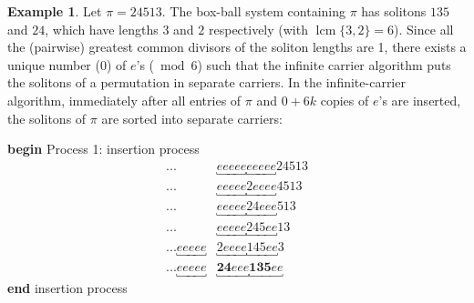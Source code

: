 \documentclass[submission]{FPSAC2021}
\theoremstyle{plain}
\theoremstyle{definition}
\newtheorem{example}[theorem]{Example}
\numberwithin{equation}{section}
\DeclareMathOperator{\lcm}{lcm}
\begin{document}
\begin{example}
Let $\pi = 24513$. The box-ball system containing $\pi$ has 
solitons $135$ and $24$, which have lengths $3$ and $2$ respectively (with $\lcm\{3,2\}=6 $).  
Since all the (pairwise) greatest common divisors of the soliton lengths are 1, there exists a unique number ($0$) of $e$'s 
($\bmod{6}$) such that the infinite carrier algorithm puts the solitons of a permutation in separate carriers. 
In the infinite-carrier algorithm, immediately after all entries of $\pi$ and $0+6k$ copies of $e$'s are inserted, the solitons of $\pi$ are sorted into separate carriers:
\begin{multicols}{2}
\begin{minipage}[H]{0.45\textwidth}
    \begin{center}
    \textbf{begin} Process 1: insertion process
    \vspace{-1em}
\begin{align*}
    ...&\underbracket{eeeee}\underbracket{eeeee}24513\\
    ...&\underbracket{eeeee}\underbracket{2eeee}4513\\
    ...&\underbracket{eeeee}\underbracket{24eee}513\\
    ...&\underbracket{eeeee}\underbracket{245ee}13\\
    ...\underbracket{eeeee}&\underbracket{2eeee}\underbracket{145ee}3\\
    ...\underbracket{eeeee}&\underbracket{\bm{24}eee}\underbracket{\bm{135}ee}
\end{align*}
            \textbf{end} insertion process 
            \end{center}
            \end{minipage}
            

\end{multicols}
\end{example}
\end{document}
